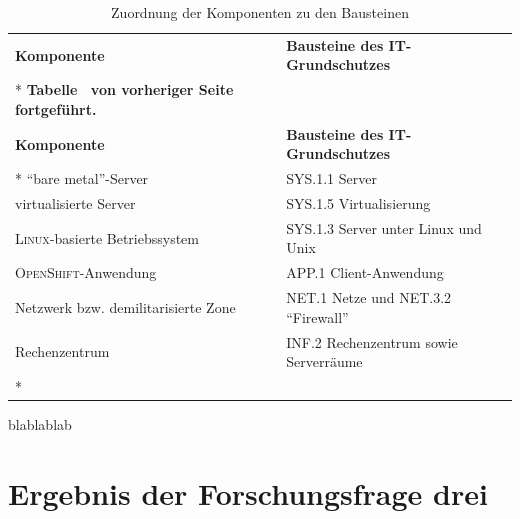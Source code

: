 \begin{longtable}{@{}lp{8.0cm}@{}}
	\toprule[1.5pt]
	\textbf{Komponente} & \textbf{Bausteine des IT-Grundschutzes} \\* \midrule
	\endfirsthead
	\multicolumn{2}{c}%
	{{\bfseries Tabelle \thetable\ von vorheriger Seite fortgeführt.}} \\
	\toprule
	\textbf{Komponente} & \textbf{Bausteine des IT-Grundschutzes} \\* \midrule
	\endhead
	\bottomrule
	\endfoot
	\endlastfoot
	\enquote{bare metal}-Server & SYS.1.1 Server\\
	virtualisierte Server & SYS.1.5 Virtualisierung \\
	\textsc{Linux}-basierte Betriebssystem & SYS.1.3 Server unter Linux und Unix\\
	\textsc{OpenShift}-Anwendung & APP.1 Client-Anwendung\\
	\pagebreak
	Netzwerk bzw. demilitarisierte Zone & NET.1 Netze und NET.3.2 \enquote{Firewall}\\
	Rechenzentrum & INF.2 Rechenzentrum sowie Serverräume\\* 
	
	\bottomrule[1.5pt]
	
	\caption{Zuordnung der Komponenten zu den Bausteinen}\label{tab:zuordnungKompBau}\\
\end{longtable}

blablablab

\section{Ergebnis der Forschungsfrage drei}


